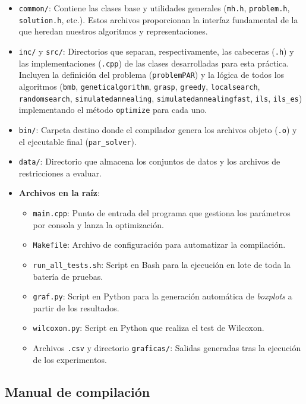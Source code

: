 \documentclass[a4paper,12pt]{article}%
\begin{document}
\begin{itemize}
	\item \texttt{common/}: Contiene las clases base y utilidades generales (\texttt{mh.h}, \texttt{problem.h}, \texttt{solution.h}, etc.). Estos archivos proporcionan la interfaz fundamental de la que heredan nuestros algoritmos y representaciones.
	\item \texttt{inc/} y \texttt{src/}: Directorios que separan, respectivamente, las cabeceras (\texttt{.h}) y las implementaciones (\texttt{.cpp}) de las clases desarrolladas para esta práctica. Incluyen la definición del problema (\texttt{problemPAR}) y la lógica de todos los algoritmos (\texttt{bmb}, \texttt{geneticalgorithm}, \texttt{grasp}, \texttt{greedy}, \texttt{localsearch}, \texttt{randomsearch}, \texttt{simulatedannealing}, \texttt{simulatedannealingfast}, \texttt{ils}, \texttt{ils\_es}) implementando el método \texttt{optimize} para cada uno.
	\item \texttt{bin/}: Carpeta destino donde el compilador genera los archivos objeto (\texttt{.o}) y el ejecutable final (\texttt{par\_solver}).
	\item \texttt{data/}: Directorio que almacena los conjuntos de datos y los archivos de restricciones a evaluar.
	\item \textbf{Archivos en la raíz}: 
	\begin{itemize}
		\item \texttt{main.cpp}: Punto de entrada del programa que gestiona los parámetros por consola y lanza la optimización.
		\item \texttt{Makefile}: Archivo de configuración para automatizar la compilación.
		\item \texttt{run\_all\_tests.sh}: Script en Bash para la ejecución en lote de toda la batería de pruebas.
		\item \texttt{graf.py}: Script en Python para la generación automática de \textit{boxplots} a partir de los resultados.
		\item \texttt{wilcoxon.py}: Script en Python que realiza el test de Wilcoxon.
		\item Archivos \texttt{.csv} y directorio \texttt{graficas/}: Salidas generadas tras la ejecución de los experimentos.
	\end{itemize}
\end{itemize}

\subsection{Manual de compilación}
\end{document}
